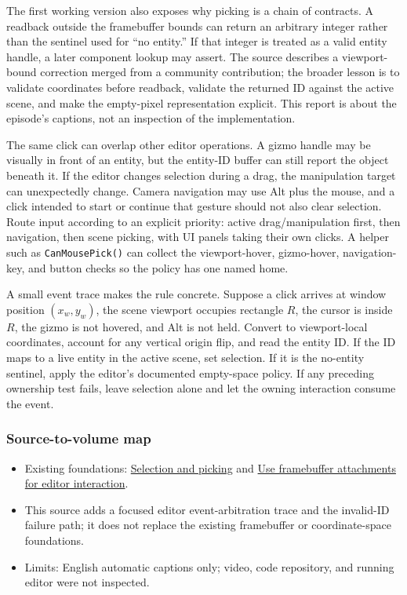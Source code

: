 The first working version also exposes why picking is a chain of contracts. A readback outside the framebuffer bounds can return an arbitrary integer rather than the sentinel used for ``no entity.'' If that integer is treated as a valid entity handle, a later component lookup may assert. The source describes a viewport-bound correction merged from a community contribution; the broader lesson is to validate coordinates before readback, validate the returned ID against the active scene, and make the empty-pixel representation explicit. This report is about the episode's captions, not an inspection of the implementation.

The same click can overlap other editor operations. A gizmo handle may be visually in front of an entity, but the entity-ID buffer can still report the object beneath it. If the editor changes selection during a drag, the manipulation target can unexpectedly change. Camera navigation may use Alt plus the mouse, and a click intended to start or continue that gesture should not also clear selection. Route input according to an explicit priority: active drag/manipulation first, then navigation, then scene picking, with UI panels taking their own clicks. A helper such as \texttt{CanMousePick()} can collect the viewport-hover, gizmo-hover, navigation-key, and button checks so the policy has one named home.

A small event trace makes the rule concrete. Suppose a click arrives at window position \((x_w,y_w)\), the scene viewport occupies rectangle \(R\), the cursor is inside \(R\), the gizmo is not hovered, and Alt is not held. Convert to viewport-local coordinates, account for any vertical origin flip, and read the entity ID. If the ID maps to a live entity in the active scene, set selection. If it is the no-entity sentinel, apply the editor's documented empty-space policy. If any preceding ownership test fails, leave selection alone and let the owning interaction consume the event.

\subsubsection{Source-to-volume map}\label{06-engine-ii-ch032-source-to-volume-map}

\begin{itemize}
\tightlist
\item
  Existing foundations: \hyperref[06-engine-ii-ch032-selection-and-picking]{Selection and picking} and \hyperref[06-engine-ii-ch032-use-framebuffer-attachments-for-editor-interaction]{Use framebuffer attachments for editor interaction}.
\item
  This source adds a focused editor event-arbitration trace and the invalid-ID failure path; it does not replace the existing framebuffer or coordinate-space foundations.
\item
  Limits: English automatic captions only; video, code repository, and running editor were not inspected.
\end{itemize}

